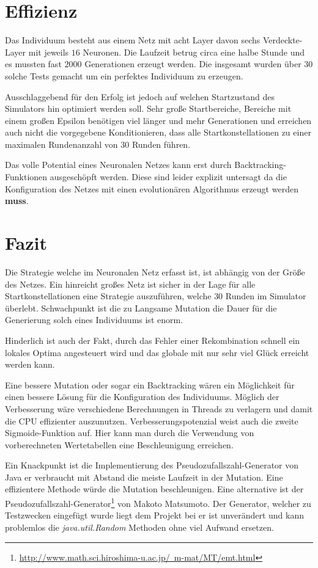 \section{Effizienz}
Das Individuum besteht aus einem Netz mit acht Layer davon sechs Verdeckte-Layer mit jeweils $16$ Neuronen. Die Laufzeit betrug circa eine halbe Stunde und es mussten fast $2000$ Generationen erzeugt werden. Die insgesamt wurden über $30$ solche Tests gemacht um ein perfektes Individuum zu erzeugen.

Ausschlaggebend für den Erfolg ist jedoch auf welchen Startzustand des Simulators hin optimiert werden soll. Sehr große Startbereiche, Bereiche mit einem großen Epsilon benötigen viel länger und mehr Generationen und erreichen auch nicht die vorgegebene Konditionieren, dass alle Startkonstellationen zu einer maximalen Rundenanzahl von $30$ Runden führen.

Das volle Potential eines Neuronalen Netzes kann erst durch Backtracking-Funktionen ausgeschöpft werden. Diese sind leider explizit untersagt da die Konfiguration des Netzes mit einen evolutionären Algorithmus erzeugt werden \textbf{muss}.

\section{Fazit}
Die Strategie welche im Neuronalen Netz erfasst ist, ist abhängig von der Größe des Netzes. Ein hinreicht großes Netz ist sicher in der Lage für alle Startkonstellationen eine Strategie auszuführen, welche $30$ Runden im Simulator überlebt. Schwachpunkt ist die zu Langsame Mutation die Dauer für die Generierung solch eines Individuums ist enorm.

Hinderlich ist auch der Fakt, durch das Fehler einer Rekombination schnell ein lokales Optima angesteuert wird und das globale mit nur sehr viel Glück erreicht werden kann.

Eine bessere Mutation oder sogar ein Backtracking wären ein Möglichkeit für einen bessere Lösung für die Konfiguration des Individuums. Möglich der Verbesserung wäre verschiedene Berechnungen in Threads zu verlagern und damit die CPU effizienter auszunutzen. Verbesserungspotenzial weist auch die zweite Sigmoide-Funktion auf. Hier kann man durch die Verwendung von vorberechneten Wertetabellen eine Beschleunigung erreichen.

Ein Knackpunkt ist die Implementierung des Pseudozufallszahl-Generator von Java er verbraucht mit Abstand die meiste Laufzeit in der Mutation. Eine effizientere Methode würde die Mutation beschleunigen. Eine alternative ist der Pseudozufallszahl-Generator\footnote{\hyperref[Mersenne-Twister]{http://www.math.sci.hiroshima-u.ac.jp/~m-mat/MT/emt.html}
} von Makoto Matsumoto. Der Generator, welcher zu Testzwecken eingefügt wurde liegt dem Projekt bei er ist unverändert und kann problemlos die \textit{java.util.Random} Methoden ohne viel Aufwand ersetzen.


